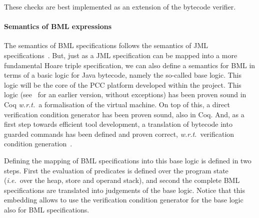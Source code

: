 These checks are best implemented as an extension of the bytecode
verifier.
 



\paragraph{Semantics of BML expressions}

The semantics of BML specifications follows the semantics of JML
specifications~\cite{JMLReferenceManual05}. But, just as a JML
specification can be mapped into a more fundamental Hoare triple
specification, we can also define a semantics for BML in terms of a
basic logic for Java bytecode, namely the so-called
\mobius base logic. This logic will be the core of the PCC platform
developed within the project. This logic (see~\cite{BeringerH06} for
an earlier version, without exceptions) has been proven sound in Coq
\emph{w.r.t.}\ a formalisation of the virtual machine. On top of this,
a direct verification condition generator has been proven sound, also
in Coq. And, as a first step towards efficient tool development, a
translation of bytecode into guarded commands has been defined and
proven correct, \emph{w.r.t.}\ verification condition
generation~\cite{LehnerM07}.

Defining the mapping of BML specifications into this \mobius base
logic is defined in two steps. First the evaluation of predicates is
defined over the program state (\emph{i.e.}\ over the heap, store and
operand stack), and second the complete BML specifications are
translated into judgements of the \mobius base logic. Notice that this
embedding allows to use the verification condition generator for the
\mobius base logic also for BML specifications.

